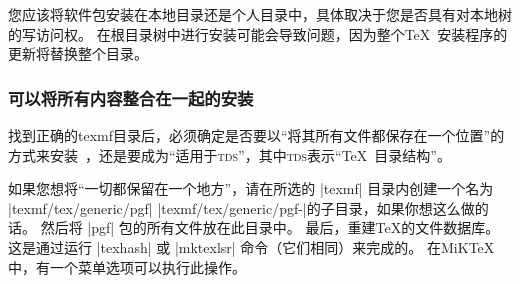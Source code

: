 
您应该将软件包安装在本地目录还是个人目录中，具体取决于您是否具有对本地树的写访问权。 在根目录树中进行安装可能会导致问题，因为整个\TeX\ 安装程序的更新将替换整个目录。


\subsubsection{可以将所有内容整合在一起的安装}


找到正确的texmf目录后，必须确定是否要以``将其所有文件都保存在一个位置''的方式来安装\pgfname\ ，还是要成为``适用于\textsc{tds}''，其中\textsc{tds}表示``\TeX\ 目录结构''。


如果您想将``一切都保留在一个地方''，请在所选的 |texmf| 目录内创建一个名为 |texmf/tex/generic/pgf| |texmf/tex/generic/pgf-|\texttt{\pgfversion}的子目录，如果你想这么做的话。 然后将 |pgf| 包的所有文件放在此目录中。 最后，重建\TeX 的文件数据库。 这是通过运行 |texhash| 或 |mktexlsr| 命令（它们相同）来完成的。 在MiK\TeX 中，有一个菜单选项可以执行此操作。


